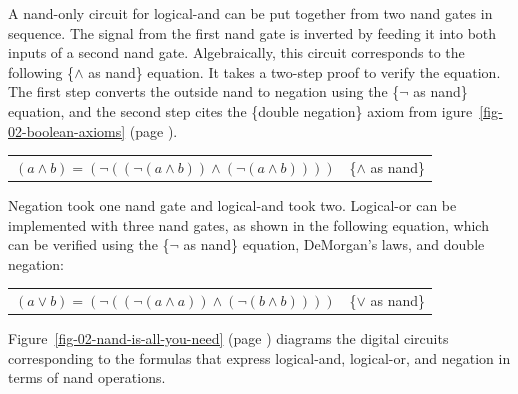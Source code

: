 A nand-only circuit for logical-and can be
put
together from two nand gates in sequence.
The signal from the first nand gate is inverted
by feeding it into both inputs of a second nand gate.
Algebraically, this circuit corresponds to the following \{$\wedge$ as nand\} equation.
It takes a two-step proof to verify the equation.
The first step converts the outside nand to negation using the
\{$\neg$ as nand\} equation, and the second step cites
the \{double negation\} axiom from igure~\ref{fig-02-boolean-axioms}
(page \pageref{fig-02-boolean-axioms}).

\begin{center}
\begin{tabular}{ll}
$(a \wedge b) = (\neg ((\neg (a \wedge b)) \wedge (\neg (a \wedge b))))$ & \{$\wedge$ as nand\}\label{and-as-nand}
\end{tabular}
\end{center}

Negation took one nand gate and
logical-and took two.
Logical-or can be implemented with three nand gates,
as shown in the following equation,
which can be verified using
the \{$\neg$ as nand\} equation, DeMorgan's laws,
and double negation:

\begin{center}
\begin{tabular}{ll}
$(a \vee b) = (\neg ((\neg(a \wedge a)) \wedge (\neg(b \wedge b))))$ & \{$\vee$ as nand\}\label{or-as-nand}
\end{tabular}
\end{center}

Figure~\ref{fig-02-nand-is-all-you-need} (page \pageref{fig-02-nand-is-all-you-need})
diagrams the digital circuits
corresponding to the formulas that express logical-and, logical-or, and negation
in terms of nand operations.

